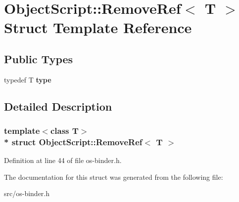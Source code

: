 \hypertarget{struct_object_script_1_1_remove_ref}{}\section{Object\+Script\+:\+:Remove\+Ref$<$ T $>$ Struct Template Reference}
\label{struct_object_script_1_1_remove_ref}
\subsection*{Public Types}
\begin{DoxyCompactItemize}
\item 
typedef T {\bfseries type}\hypertarget{struct_object_script_1_1_remove_ref_a07af0071234048798933c7e3ba530336}{}\label{struct_object_script_1_1_remove_ref_a07af0071234048798933c7e3ba530336}

\end{DoxyCompactItemize}


\subsection{Detailed Description}
\subsubsection*{template$<$class T$>$\\*
struct Object\+Script\+::\+Remove\+Ref$<$ T $>$}



Definition at line 44 of file os-\/binder.\+h.



The documentation for this struct was generated from the following file\+:\begin{DoxyCompactItemize}
\item 
src/os-\/binder.\+h\end{DoxyCompactItemize}
